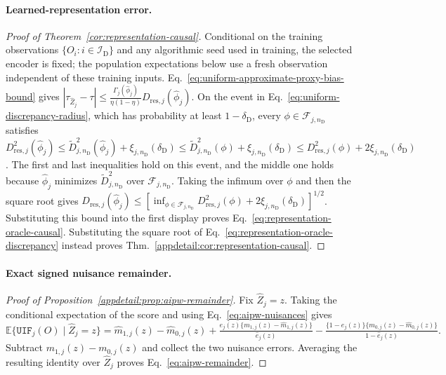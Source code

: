\paragraph{Learned-representation error.}
\begin{proof}[Proof of Theorem~\ref{cor:representation-causal}]
Conditional on the training observations $\{O_i:i\in\mathcal I_{\mathrm D}\}$ and any algorithmic seed used in training, the selected encoder is fixed; the population expectations below use a fresh observation independent of these training inputs. Eq.~\eqref{eq:uniform-approximate-proxy-bias-bound} gives
\(|\tau_{\widehat Z_j}-\tau| \le \frac{\Gamma_j(\widehat\phi_j)}{\eta(1-\eta)} D_{\mathrm{res},j}(\widehat\phi_j).\)
On the event in Eq.~\eqref{eq:uniform-discrepancy-radius}, which has probability at least $1-\delta_{\mathrm D}$, every $\phi\in\mathcal F_{j,n_{\mathrm D}}$ satisfies \(D_{\mathrm{res},j}^2(\widehat\phi_j)\le\widetilde D_{j,n_{\mathrm D}}^2(\widehat\phi_j)+\xi_{j,n_{\mathrm D}}(\delta_{\mathrm D})\le\widetilde D_{j,n_{\mathrm D}}^2(\phi)+\xi_{j,n_{\mathrm D}}(\delta_{\mathrm D})\le D_{\mathrm{res},j}^2(\phi)+2\xi_{j,n_{\mathrm D}}(\delta_{\mathrm D})\). The first and last inequalities hold on this event, and the middle one holds because $\widehat\phi_j$ minimizes $\widetilde D_{j,n_{\mathrm D}}^2$ over $\mathcal F_{j,n_{\mathrm D}}$. Taking the infimum over $\phi$ and then the square root gives $D_{\mathrm{res},j}(\widehat\phi_j)\le[\inf_{\phi\in\mathcal F_{j,n_{\mathrm D}}}D_{\mathrm{res},j}^2(\phi)+2\xi_{j,n_{\mathrm D}}(\delta_{\mathrm D})]^{1/2}$. Substituting this bound into the first display proves Eq.~\eqref{eq:representation-oracle-causal}. Substituting the square root of Eq.~\eqref{eq:representation-oracle-discrepancy} instead proves Thm.~\ref{appdetail:cor:representation-causal}.
\end{proof}

\paragraph{Exact signed nuisance remainder.}
\begin{proof}[Proof of Proposition~\ref{appdetail:prop:aipw-remainder}]
Fix $\widehat Z_j=z$. Taking the conditional expectation of the score and using Eq.~\eqref{eq:aipw-nuisances} gives
\(\mathbb E\{\mathtt{UIF}_j(O)\mid\widehat Z_j=z\} ={} \widehat m_{1,j}(z)-\widehat m_{0,j}(z)+ \frac{e_j(z)\{m_{1,j}(z)-\widehat m_{1,j}(z)\}} {\widehat e_j(z)}- \frac{\{1-e_j(z)\}\{m_{0,j}(z)-\widehat m_{0,j}(z)\}} {1-\widehat e_j(z)}.\)
Subtract $m_{1,j}(z)-m_{0,j}(z)$ and collect the two nuisance errors. Averaging the resulting identity over $\widehat Z_j$ proves Eq.~\eqref{eq:aipw-remainder}.
\end{proof}

